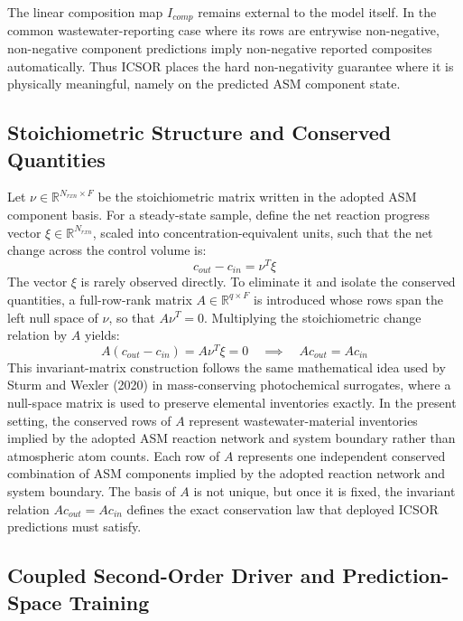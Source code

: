 \documentclass[11pt]{article}
\begin{document}
The linear composition map $I_{comp}$ remains external to the model itself. In the common wastewater-reporting case where its rows are entrywise non-negative, non-negative component predictions imply non-negative reported composites automatically. Thus ICSOR places the hard non-negativity guarantee where it is physically meaningful, namely on the predicted ASM component state.

\subsection{Stoichiometric Structure and Conserved Quantities}

Let $\nu \in \mathbb{R}^{N_{rxn} \times F}$ be the stoichiometric matrix written in the adopted ASM component basis. For a steady-state sample, define the net reaction progress vector $\xi \in \mathbb{R}^{N_{rxn}}$, scaled into concentration-equivalent units, such that the net change across the control volume is:
\begin{equation}
 c_{out} - c_{in} = \nu^T \xi
\end{equation}
The vector $\xi$ is rarely observed directly. To eliminate it and isolate the conserved quantities, a full-row-rank matrix $A \in \mathbb{R}^{q \times F}$ is introduced whose rows span the left null space of $\nu$, so that $A\nu^T = 0$. Multiplying the stoichiometric change relation by $A$ yields:
\begin{equation}
 A(c_{out} - c_{in}) = A \nu^T \xi = 0 \quad \implies \quad A c_{out} = A c_{in}
\end{equation}
This invariant-matrix construction follows the same mathematical idea used by Sturm and Wexler (2020) in mass-conserving photochemical surrogates, where a null-space matrix is used to preserve elemental inventories exactly. In the present setting, the conserved rows of $A$ represent wastewater-material inventories implied by the adopted ASM reaction network and system boundary rather than atmospheric atom counts.
Each row of $A$ represents one independent conserved combination of ASM components implied by the adopted reaction network and system boundary. The basis of $A$ is not unique, but once it is fixed, the invariant relation $Ac_{out} = Ac_{in}$ defines the exact conservation law that deployed ICSOR predictions must satisfy.

\subsection{Coupled Second-Order Driver and Prediction-Space Training}
\end{document}

